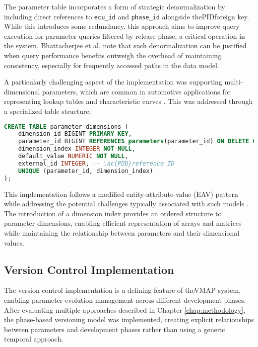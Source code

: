 The parameter table incorporates a form of strategic denormalization by including direct references to \texttt{ecu\_id} and \texttt{phase\_id} alongside the\ac{PID}foreign key. While this introduces some redundancy, this approach aims to improve query execution for parameter queries filtered by release phase, a critical operation in the system. Bhattacherjee et al. \cite{bhattacherjee2015principles} note that such denormalization can be justified when query performance benefits outweigh the overhead of maintaining consistency, especially for frequently accessed paths in the data model.

A particularly challenging aspect of the implementation was supporting multi-dimensional parameters, which are common in automotive applications for representing lookup tables and characteristic curves \cite{kiencke2000automotive}. This was addressed through a specialized table structure:

\begin{lstlisting}[language=SQL, caption={Parameter Dimension Implementation}, label={lst:parameter-dimension}]
CREATE TABLE parameter_dimensions (
    dimension_id BIGINT PRIMARY KEY,
    parameter_id BIGINT REFERENCES parameters(parameter_id) ON DELETE CASCADE,
    dimension_index INTEGER NOT NULL,
    default_value NUMERIC NOT NULL,
    external_id INTEGER, -- \ac{PDD}reference ID
    UNIQUE (parameter_id, dimension_index)
);
\end{lstlisting}

This implementation follows a modified entity-attribute-value (EAV) pattern while addressing the potential challenges typically associated with such models \cite{nadkarni2016revisiting}. The introduction of a dimension index provides an ordered structure to parameter dimensions, enabling efficient representation of arrays and matrices while maintaining the relationship between parameters and their dimensional values.

\subsection{Version Control Implementation}
\label{subsec:version-control-implementation}

The version control implementation is a defining feature of the\ac{VMAP} system, enabling parameter evolution management across different development phases. After evaluating multiple approaches described in Chapter \ref{chap:methodology}, the phase-based versioning model was implemented, creating explicit relationships between parameters and development phases rather than using a generic temporal approach.

